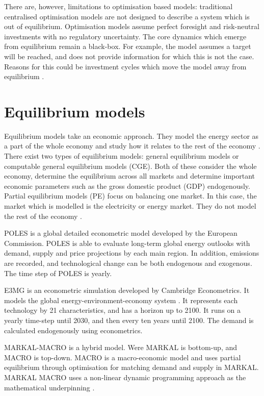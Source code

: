 There are, however, limitations to optimisation based models: traditional centralised optimisation models are not designed to describe a system which is out of equilibrium. Optimisation models assume perfect foresight and risk-neutral investments with no regulatory uncertainty. The core dynamics which emerge from equilibrium remain a black-box. For example, the model assumes a target will be reached, and does not provide information for which this is not the case. Reasons for this could be investment cycles which move the model away from equilibrium \cite{Chappin2017}.


\section{Equilibrium models}
\label{sec:litreview:equilibrium}

Equilibrium models take an economic approach. They model the energy sector as a part of the whole economy and study how it relates to the rest of the economy \cite{Ringkjob2018}. There exist two types of equilibrium models: general equilibrium models or computable general equilibrium models (CGE). Both of these consider the whole economy, determine the equilibrium across all markets and determine important economic parameters such as the gross domestic product (GDP) endogenously. Partial equilibrium models (PE) focus on balancing one market. In this case, the market which is modelled is the electricity or energy market. They do not model the rest of the economy \cite{Ringkjob2018, Hall2016a}. 

POLES is a global detailed econometric model developed by the European Commission. POLES is able to evaluate long-term global energy outlooks with demand, supply and price projections by each main region. In addition,  emissions are recorded, and technological change can be both endogenous and exogenous. The time step of POLES is yearly.

E3MG is an econometric simulation developed by Cambridge Econometrics. It models the global energy-environment-economy system \cite{Dagoumas2010}. It represents each technology by 21 characteristics, and has a horizon up to 2100. It runs on a yearly time-step until 2030, and then every ten years until 2100. The demand is calculated endogenously using econometrics.

MARKAL-MACRO is a hybrid model. Were MARKAL is bottom-up, and MACRO is top-down. MACRO is a macro-economic model and uses partial equilibrium through optimisation for matching demand and supply in MARKAL. MARKAL MACRO uses a non-linear dynamic programming approach as the mathematical underpinning \cite{Hall2016a}.


